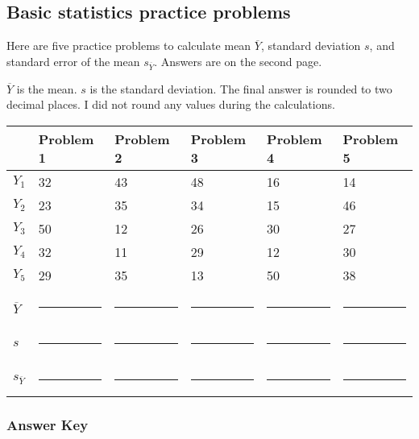 \documentclass[12pt]{exam}
\begin{document}
\subsection*{Basic statistics practice problems}


Here are five practice problems to calculate mean $\overline{Y}$, standard deviation $s$, and standard error of the mean $s_{\overline{Y}}$.  Answers are on the second page.

$\overline{Y}$ is the mean. $s$ is the standard deviation. The final answer is rounded to two decimal places. I did not round any values during the calculations.


\begin{tabular}[l]{@{}R{0.5in}R{0.75in}R{0.75in}R{0.75in}R{0.75in}R{0.75in}@{}}	
\toprule
	& Problem 1	& Problem 2	& Problem 3	& Problem 4	& Problem 5\\
\midrule
$Y_1$	& 32	& 43	& 48	& 16	& 14\\
$Y_2$	& 23	& 35	& 34	& 15	& 46\\
$Y_3$	& 50	& 12	& 26	& 30	& 27\\
$Y_4$	& 32	& 11	& 29	& 12	& 30\\
$Y_5$	& 29	& 35	& 13	& 50	& 38\\
& 	& 	& 	& \\
$\overline{Y}$	& \rule{0.5in}{0.4pt}	& \rule{0.5in}{0.4pt}	& \rule{0.5in}{0.4pt}	& \rule{0.5in}{0.4pt}	& \rule{0.5in}{0.4pt}\\
&	&	&	& \\
$s$	& \rule{0.5in}{0.4pt}	& \rule{0.5in}{0.4pt}	& \rule{0.5in}{0.4pt}	& \rule{0.5in}{0.4pt}	& \rule{0.5in}{0.4pt}\\
&	&	&	& \\
$s_{\overline{Y}}$	& \rule{0.5in}{0.4pt}	& \rule{0.5in}{0.4pt}	& \rule{0.5in}{0.4pt}	& \rule{0.5in}{0.4pt}	& \rule{0.5in}{0.4pt}\\
\bottomrule
\end{tabular}

\newpage

\subsubsection*{Answer Key}
\end{document}
